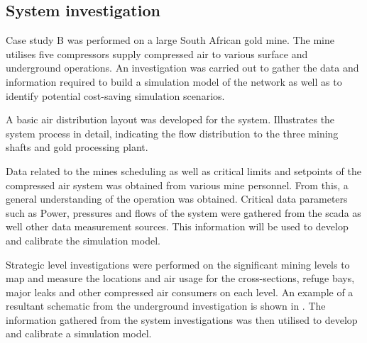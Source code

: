 	\subsection{System investigation}
	Case study B was performed on a large South African gold mine. The mine utilises five compressors supply compressed air to various surface and underground operations. An investigation was carried out to gather the data and information required to build a simulation model of the network as well as to identify potential cost-saving simulation scenarios.
	\par 
	A basic air distribution layout was developed for the system.  Illustrates the system process in detail, indicating the flow distribution to the three mining shafts and gold processing plant.
	\par 
	Data related to the mines scheduling as well as critical limits and setpoints of the compressed air system was obtained from various mine personnel. From this, a general understanding of the operation was obtained.  Critical data parameters such as Power, pressures and flows of the system were gathered from the \gls{scada} as well other data measurement sources. This information will be used to develop and calibrate the simulation model.
	\par 
	Strategic level investigations were performed on the significant mining levels to map and measure the locations and air usage for the cross-sections, refuge bays, major leaks and other compressed air consumers on each level. An example of a resultant schematic from the underground investigation is shown in . The information gathered from the system investigations was then utilised to develop and calibrate a simulation model.
